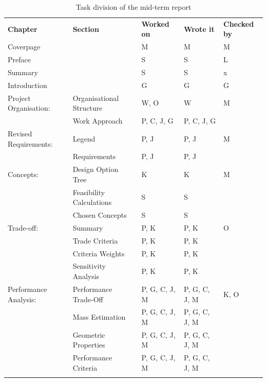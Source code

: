 \begin{longtable}[htb]{llp{1.5cm}p{1.5cm}p{1cm}} \label{tab:taskdivi} 
    \centering
    \caption{Task division of the mid-term report} \\
    \toprule
    \textbf{Chapter}  & \textbf{Section} & \textbf{Worked on}  & \textbf{Wrote it}  & \textbf{Checked by} \\ \midrule
    Coverpage     &        & M                   &  M                 & M                 \\ \hdashline
    Preface       &        & S                   &  S                 & L                    \\ \hdashline
    Summary       &        & S                   &  S                 & x                \\ \hdashline
    Introduction  &        & G                   &  G                 & G                    \\ \hdashline
    Project Organisation:  & Organisational Structure & W, O        & W     &  M                 \\ \hdashline
        &  Work Approach     & P, C, J, G        & P, C, J, G &               \\ \hdashline
    Revised Requirements: & Legend        & P, J     & P, J     &  M              \\ \hdashline
        &  Requirements      & P, J     & P, J     &           \\ \hdashline
    Concepts:   &  Design Option Tree & K          & K              & M \\ \hdashline
        & Feasibility Calculations & S   & S &  \\ \hdashline
        & Chosen Concepts & S & S &  \\ \hdashline
    Trade-off:  & Summary & P, K & P, K & O \\ \hdashline 
        & Trade Criteria & P, K & P, K &  \\ \hdashline
        & Criteria Weights & P, K & P, K & \\ \hdashline
        & Sensitivity Analysis &P, K & P, K & \\ \hdashline
    Performance Analysis: & Performance Trade-Off & P, G, C, J, M & P, G, C, J, M & K, O \\ \hdashline
        & Mass Estimation & P, G, C, J, M & P, G, C, J, M &  \\ \hdashline
        & Geometric Properties & P, G, C, J, M & P, G, C, J, M & \\ \hdashline
        & Performance Criteria & P, G, C, J, M & P, G, C, J, M & \\ \hdashline

\end{longtable}
